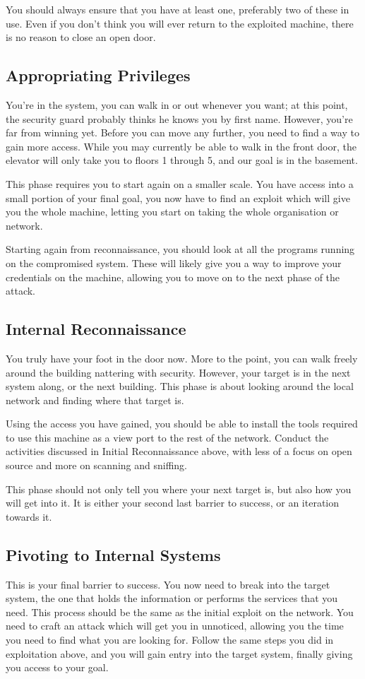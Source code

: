 			You should always ensure that you have at least one, preferably two of these in use. 
			Even if you don't think you will ever return to the exploited machine, there is no reason to close an open door. 
		\subsection{Appropriating Privileges}
			You're in the system, you can walk in or out whenever you want; at this point, the security guard probably thinks he knows you by first name. 
			However, you're far from winning yet. 
			Before you can move any further, you need to find a way to gain more access. 
			While you may currently be able to walk in the front door, the elevator will only take you to floors 1 through 5, and our goal is in the basement. 

			This phase requires you to start again on a smaller scale. 
			You have access into a small portion of your final goal, you now have to find an exploit which will give you the whole machine, letting you start on taking the whole organisation or network. 

			Starting again from reconnaissance, you should look at all the programs running on the compromised system. 
			These will likely give you a way to improve your credentials on the machine, allowing you to move on to the next phase of the attack. 

		\subsection{Internal Reconnaissance}
			You truly have your foot in the door now. 
			More to the point, you can walk freely around the building nattering with security. 
			However, your target is in the next system along, or the next building. 
			This phase is about looking around the local network and finding where that target is. 

			Using the access you have gained, you should be able to install the tools required to use this machine as a view port to the rest of the network. 
			Conduct the activities discussed in Initial Reconnaissance above, with less of a focus on open source and more on scanning and sniffing. 

			This phase should not only tell you where your next target is, but also how you will get into it. 
			It is either your second last barrier to success, or an iteration towards it. 
		\subsection{Pivoting to Internal Systems}
			This is your final barrier to success. 
			You now need to break into the target system, the one that holds the information or performs the services that you need. 
			This process should be the same as the initial exploit on the network. 
			You need to craft an attack which will get you in unnoticed, allowing you the time you need to find what you are looking for. 
			Follow the same steps you did in exploitation above, and you will gain entry into the target system, finally giving you access to your goal. 
